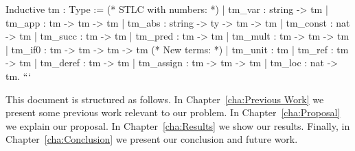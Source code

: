 Inductive tm  : Type :=
    (* STLC with numbers: *)
    | tm_var    : string -> tm
    | tm_app    : tm -> tm -> tm
    | tm_abs    : string -> ty -> tm -> tm
    | tm_const  : nat -> tm
    | tm_succ    : tm -> tm
    | tm_pred    : tm -> tm
    | tm_mult    : tm -> tm -> tm
    | tm_if0  : tm -> tm -> tm -> tm
    (* New terms: *)
    | tm_unit   : tm
    | tm_ref    : tm -> tm
    | tm_deref  : tm -> tm
    | tm_assign : tm -> tm -> tm
    | tm_loc    : nat -> tm.
```




This document is structured as follows. In Chapter~\ref{cha:Previous Work} we present some previous work relevant to our problem. In Chapter~\ref{cha:Proposal} we explain our proposal. In Chapter~\ref{cha:Results} we show our results. Finally, in Chapter~\ref{cha:Conclusion} we present our conclusion and future work.


